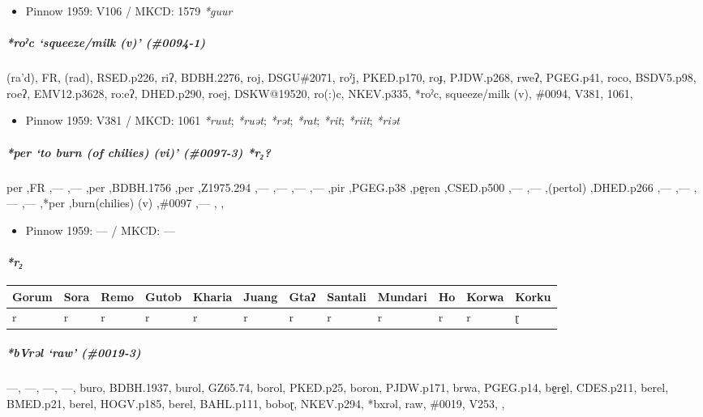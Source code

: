 \documentclass[a4paper,]{article}
\providecommand{\tightlist}{%
  \setlength{\itemsep}{0pt}\setlength{\parskip}{0pt}}
\let\oldparagraph\paragraph
\renewcommand{\paragraph}[1]{\oldparagraph{#1}\mbox{}}
\let\oldsubparagraph\subparagraph
\renewcommand{\subparagraph}[1]{\oldsubparagraph{#1}\mbox{}}
\begin{document}
\begin{itemize}
\tightlist
\item
  Pinnow 1959: V106 / MKCD: 1579 \emph{*guur}
\end{itemize}

\subparagraph{\texorpdfstring{\emph{*roˀc} `squeeze/milk (v)'
(\#0094-1)}{*roˀc squeeze/milk (v) (\#0094-1)}}\label{roux2c0c-squeezemilk-v-0094-1}

(ra'd), FR, (rad), RSED.p226, riʔ, BDBH.2276, roj, DSGU\#2071, roˀj,
PKED.p170, roɟ, PJDW.p268, rweʔ, PGEG.p41, roco, BSDV5.p98, roeʔ,
EMV12.p3628, ro:eʔ, DHED.p290, roej, DSKW@19520, ro(:)c, NKEV.p335,
*roˀc, squeeze/milk (v), \#0094, V381, 1061,

\begin{itemize}
\tightlist
\item
  Pinnow 1959: V381 / MKCD: 1061 \emph{*ruut}; \emph{*ruət};
  \emph{*rət}; \emph{*rat}; \emph{*rit}; \emph{*riit}; \emph{*riət}
\end{itemize}

\subparagraph{\texorpdfstring{\emph{*per} `to burn (of chilies) (vi)'
(\#0097-3)
\emph{*r₂}?}{*per to burn (of chilies) (vi) (\#0097-3) *r₂?}}\label{per-to-burn-of-chilies-vi-0097-3-r}

per ,FR ,--- ,--- ,per ,BDBH.1756 ,per ,Z1975.294 ,--- ,--- ,--- ,---
,pir ,PGEG.p38 ,pe̠ṛen ,CSED.p500 ,--- ,--- ,(pertol) ,DHED.p266 ,---
,--- ,--- ,--- ,*per ,burn(chilies) (v) ,\#0097 ,--- , ,

\begin{itemize}
\tightlist
\item
  Pinnow 1959: --- / MKCD: ---
\end{itemize}

\paragraph{\texorpdfstring{\emph{*r₂}}{*r₂}}\label{r-1}

\begin{longtable}[]{@{}llllllllllll@{}}
\toprule
Gorum & Sora & Remo & Gutob & Kharia & Juang & Gtaʔ & Santali & Mundari
& Ho & Korwa & Korku\tabularnewline
\midrule
\endhead
r & r & r & r & r & r & r & r & r & r & r & ɽ\tabularnewline
\bottomrule
\end{longtable}

\subparagraph{\texorpdfstring{\emph{*bVrəl} `raw'
(\#0019-3)}{*bVrəl raw (\#0019-3)}}\label{bvrux259l-raw-0019-3}

---, ---, ---, ---, buro, BDBH.1937, burol, GZ65.74, borol, PKED.p25,
boron, PJDW.p171, brwa, PGEG.p14, be̠re̠l, CDES.p211, berel, BMED.p21,
berel, HOGV.p185, berel, BAHL.p111, boboɽ, NKEV.p294, *bxrəl, raw,
\#0019, V253, ,
\end{document}
